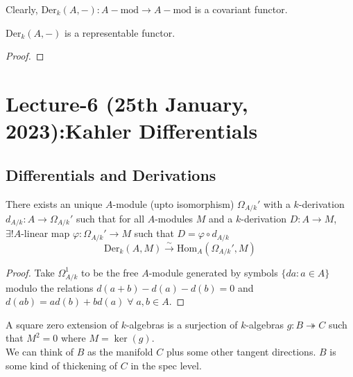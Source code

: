\documentclass[oneside, 12pt]{scrbook}
\newcommand{\Hom}{\mathrm{Hom}}
\theoremstyle{theorem}
\begin{document}
Clearly, $\mathrm{Der}_{k}(A, -): A-\mathrm{mod} \rightarrow A-\mathrm{mod}$ is a covariant functor.

\begin{proposition}
$\mathrm{Der}_{k}(A,-)$ is a representable functor.
\end{proposition}

\begin{proof}

\end{proof}

\chapter{Lecture-6 (25th January, 2023):Kahler Differentials}

\section{Differentials and Derivations}

\begin{theorem}
There exists an unique $A$-module (upto isomorphism) $\Omega_{A/k}'$ with a $k$-derivation $d_{A/k}: A \rightarrow \Omega_{A/k}'$ such that for all $A$-modules $M$ and a $k$-derivation $D: A \rightarrow M$, $\exists ! A$-linear map $\varphi : \Omega_{A/k}' \rightarrow M$ such that $D = \varphi \circ d_{A/k}$ $$\mathrm{Der}_{k}(A,M) \xrightarrow{\sim} \Hom_{A}(\Omega_{A/k}' , M)$$
\end{theorem}

\begin{proof}
Take $\Omega_{A/k}^1$ to be the free $A$-module generated by symbols $\{da: a\in A\}$ modulo the relations $d(a+b) - d(a) - d(b) =0$ and $d(ab) = ad(b) + bd(a) \; \forall \; a,b \in A$.
\end{proof}

\begin{definition}
A square zero extension of $k$-algebras is a surjection of $k$-algebras $g: B \twoheadrightarrow C$ such that $M^2 = 0$ where $M = \ker(g)$. \\
We can think of $B$ as the manifold $C$ plus some other tangent directions. $B$ is some kind of thickening of $C$ in the spec level.
\end{definition}
\end{document}
